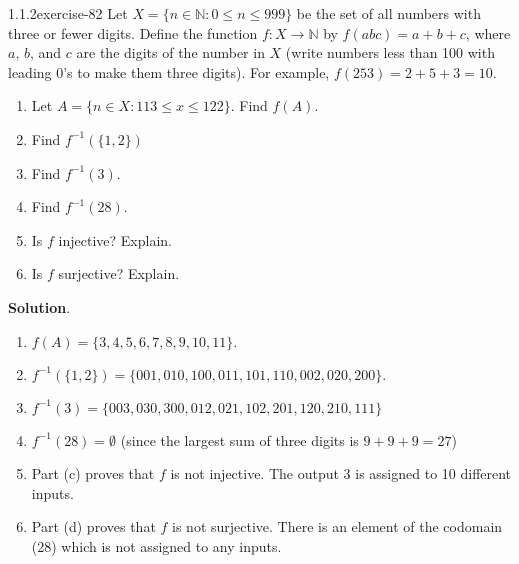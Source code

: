 \documentclass[twoside,11pt,]{book}
\numberwithin{equation}{chapter}
\newcommand{\N}{\mathbb N}
\newcommand{\inv}{^{-1}}
\newcommand{\st}{:}
\begin{document}
\begin{divisionsolution}{1.1.2}{}{exercise-82}%
\hypertarget{p-1298}{}%
Let \(X = \{n \in \N \st 0 \le n \le 999\}\) be the set of all numbers with three or fewer digits. Define the function \(f:X \to \N\) by \(f(abc) = a+b+c\text{,}\) where \(a\text{,}\) \(b\text{,}\) and \(c\) are the digits of the number in \(X\) (write numbers less than 100 with leading 0's to make them three digits). For example, \(f(253) = 2 + 5 + 3 = 10\text{.}\)\leavevmode%
\begin{enumerate}[label=(\alph*)]
\item\hypertarget{li-976}{}\hypertarget{p-1299}{}%
Let \(A = \{n \in X \st 113 \le x \le 122\}\text{.}\) Find \(f(A)\text{.}\)%
\item\hypertarget{li-977}{}\hypertarget{p-1301}{}%
Find \(f\inv(\{1,2\})\)%
\item\hypertarget{li-978}{}\hypertarget{p-1303}{}%
Find \(f\inv(3)\text{.}\)%
\item\hypertarget{li-979}{}\hypertarget{p-1305}{}%
Find \(f\inv(28)\text{.}\)%
\item\hypertarget{li-980}{}\hypertarget{p-1307}{}%
Is \(f\) injective? Explain.%
\item\hypertarget{li-981}{}\hypertarget{p-1308}{}%
Is \(f\) surjective? Explain.%
\end{enumerate}
%
\par\smallskip%
\noindent\textbf{Solution}.\quad%
\hypertarget{p-1309}{}%
\leavevmode%
\begin{enumerate}[label=(\alph*)]
\item\hypertarget{li-982}{}\hypertarget{p-1310}{}%
\(f(A) = \{3,4,5,6,7,8,9,10,11\}\text{.}\)%
\item\hypertarget{li-983}{}\hypertarget{p-1311}{}%
\(f\inv(\{1,2\}) = \{001, 010, 100, 011, 101, 110, 002, 020, 200\}\text{.}\)%
\item\hypertarget{li-984}{}\hypertarget{p-1312}{}%
\(f\inv(3) = \{003, 030, 300, 012, 021, 102, 201, 120, 210, 111\}\)%
\item\hypertarget{li-985}{}\hypertarget{p-1313}{}%
\(f\inv(28) = \emptyset\) (since the largest sum of three digits is \(9+9+9 = 27\))%
\item\hypertarget{li-986}{}\hypertarget{p-1314}{}%
Part (c) proves that \(f\) is not injective. The output 3 is assigned to 10 different inputs.%
\item\hypertarget{li-987}{}\hypertarget{p-1315}{}%
Part (d) proves that \(f\) is not surjective. There is an element of the codomain (28) which is not assigned to any inputs.%
\end{enumerate}
%
\end{divisionsolution}%
\end{document}
